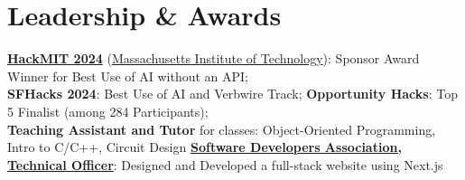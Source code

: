 \documentclass[11pt]{article}       %
\begin{document}
\section*{Leadership \& Awards}
\href{https://hackmit.org}{\textbf{HackMIT 2024}} (\href{https://mit.edu}{Massachusetts Institute of Technology}): Sponsor Award Winner for Best Use of AI without an API; \\
\textbf{SFHacks 2024}: Best Use of AI and Verbwire Track; 
\textbf{Opportunity Hacks}: Top 5 Finalist (among 284 Participants);   \\ 
\textbf{Teaching Assistant and Tutor} for classes: Object-Oriented Programming, Intro to C/C++, Circuit Design
\textbf{\href{https://thesoda.io//}{Software Developers Association, Technical Officer}}: Designed and Developed a full-stack website using Next.js 
\end{document}
